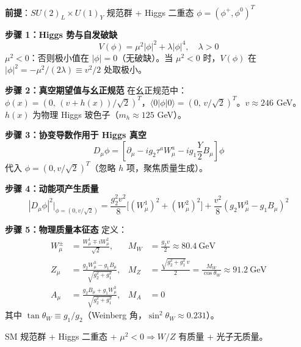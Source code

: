 \begin{derivationbox}

\noindent\textbf{前提}：$SU(2)_L\times U(1)_Y$ 规范群 + Higgs 二重态 $\phi = (\phi^+,\phi^0)^T$

\noindent\textbf{步骤 1：Higgs 势与自发破缺}
\begin{equation}
V(\phi) = \mu^2|\phi|^2 + \lambda|\phi|^4,\quad \lambda>0
\end{equation}
\fbox{[N]} $\mu^2 < 0$：否则极小值在 $|\phi|=0$（无破缺）。当 $\mu^2 < 0$ 时，$V(\phi)$ 在 $|\phi|^2 = -\mu^2/(2\lambda) \equiv v^2/2$ 处取极小。

\noindent\textbf{步骤 2：真空期望值与幺正规范}
在幺正规范中：$\phi(x) = (0,\,(v+h(x))/\sqrt{2})^T$，$\langle 0|\phi|0\rangle = (0,\,v/\sqrt{2})^T$。$v \approx 246$ GeV。$h(x)$ 为物理 Higgs 玻色子（$m_h \approx 125$ GeV）。

\noindent\textbf{步骤 3：协变导数作用于 Higgs 真空}
\begin{equation}
D_\mu\phi = \left[\partial_\mu - i g_2 \tau^a W^a_\mu - i g_1\frac{Y}{2}B_\mu\right]\phi
\end{equation}
代入 $\phi = (0,v/\sqrt{2})^T$（忽略 $h$ 项，聚焦质量生成）。

\noindent\textbf{步骤 4：动能项产生质量}
\begin{equation}
|D_\mu\phi|^2\Big|_{\phi=(0,v/\sqrt{2})} = \frac{g_2^2 v^2}{8}\big[(W^1_\mu)^2 + (W^2_\mu)^2\big] + \frac{v^2}{8}(g_2 W^3_\mu - g_1 B_\mu)^2
\end{equation}

\noindent\textbf{步骤 5：物理质量本征态}
定义：
\begin{align}
W^\pm_\mu &= \frac{W^1_\mu \mp iW^2_\mu}{\sqrt{2}}, &
M_W &= \frac{g_2 v}{2} \approx 80.4\ \text{GeV} \\
Z_\mu &= \frac{g_2 W^3_\mu - g_1 B_\mu}{\sqrt{g_2^2+g_1^2}}, &
M_Z &= \frac{\sqrt{g_2^2+g_1^2}\,v}{2} = \frac{M_W}{\cos\theta_W} \approx 91.2\ \text{GeV} \\
A_\mu &= \frac{g_2 B_\mu + g_1 W^3_\mu}{\sqrt{g_2^2+g_1^2}}, &
M_A &= 0
\end{align}
其中 $\tan\theta_W \equiv g_1/g_2$（Weinberg 角，$\sin^2\theta_W \approx 0.231$）。

\fbox{[S]} SM 规范群 + Higgs 二重态 + $\mu^2<0 \Rightarrow W/Z$ 有质量 + 光子无质量。

\end{derivationbox}

